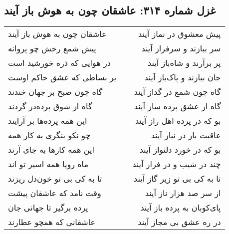 \begin{center}
\section*{غزل شماره ۳۱۴: عاشقان چون به هوش باز آیند}
\label{sec:314}
\begin{longtable}{l p{0.5cm} r}
عاشقان چون به هوش باز آیند
&&
پیش معشوق در نماز آیند
\\
پیش شمع رخش چو پروانه
&&
سر ببازند و سرفراز آیند
\\
در هوایی که ذره خورشید است
&&
پر برآرند و شاه‌باز آیند
\\
بر بساطی که عشق حاکم اوست
&&
جان ببازند و پاک‌باز آیند
\\
گاه چون صبح بر جهان خندند
&&
گاه چون شمع در گداز آیند
\\
گاه از شوق پرده‌در گردند
&&
گاه از عشق پرده ساز آیند
\\
این همه پرده‌ها بر آرایند
&&
بو که در پرده اهل راز آیند
\\
چو نکو بنگری به کار همه
&&
عاقبت باز در نیاز آیند
\\
این همه کارها به جای آرند
&&
بو که در خورد دلنواز آیند
\\
ماه رویا همه اسیر تو اند
&&
چند در شیب و در فراز آیند
\\
تا به کی بی تو خون‌دل ریزند
&&
تا به کی بی تو زیر گاز آیند
\\
وقت نامد که عاشقان پیشت
&&
از سر صد هزار ناز آیند
\\
پرده برگیر تا جهانی جان
&&
پای‌کوبان به پرده باز آیند
\\
عاشقانی که همچو عطارند
&&
در ره عشق بی مجاز آیند
\\
\end{longtable}
\end{center}
